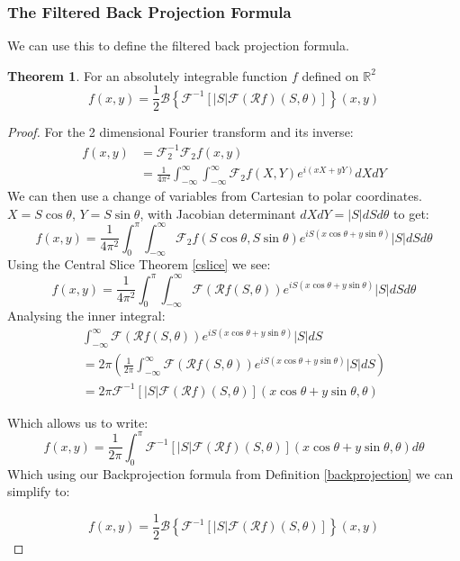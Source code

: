 \documentclass{article}
\theoremstyle{definition}
\newtheorem{theorem}{Theorem}
\begin{document}
\subsubsection{The Filtered Back Projection Formula}
We can use this to define the filtered back projection formula.
\begin{theorem}
For an absolutely integrable function $f$ defined on $\mathbb{R}^2$
$$
f(x,y) = \frac{1}{2} \mathcal{B} \left\lbrace \mathcal{F}^{-1} \left[ |S| \mathcal{F} \left( \mathcal{R}f \right) \left( S, \theta \right) \right] \right\rbrace (x,y)
$$
\end{theorem}
\begin{proof}
For the 2 dimensional Fourier transform and its inverse:
\begin{align}
f(x,y) &= \mathcal{F}_2^{-1} \mathcal{F}_2 f(x,y) \\
&= \frac{1}{4 \pi^2} \int_{-\infty}^{\infty} \int_{-\infty}^{\infty} \mathcal{F}_2 f(X, Y) e^{i (x X + yY)}dXdY
\end{align}
We can then use a change of variables from Cartesian to polar coordinates.
$X = S \cos \theta$, $Y = S \sin \theta$, with Jacobian determinant $dXdY = |S| dS  d\theta$ to get:
$$
f(x,y) = \frac{1}{4 \pi^2} \int_{0}^{\pi} \int_{-\infty}^{\infty} \mathcal{F}_2 f(S \cos \theta, S \sin \theta) e^{i S(x \cos \theta + y \sin \theta)} |S|dSd\theta
$$
Using the Central Slice Theorem \ref{cslice} we see:
$$
f(x,y) = \frac{1}{4 \pi^2} \int_{0}^{\pi} \int_{-\infty}^{\infty} \mathcal{F}(\mathcal{R} f(S , \theta)) e^{i S(x \cos \theta + y \sin \theta)} |S|dSd\theta
$$
Analysing the inner integral:
\begin{align*}
\int_{-\infty}^{\infty} \mathcal{F}(\mathcal{R} f(S , \theta)) e^{i S(x \cos \theta + y \sin \theta)} |S|dS \\
= 2\pi \left( \frac{1}{2 \pi} \int_{-\infty}^{\infty} \mathcal{F}(\mathcal{R} f(S , \theta)) e^{i S(x \cos \theta + y \sin \theta)} |S|dS \right) \\
= 2\pi \mathcal{F}^{-1} \left[ |S| \mathcal{F} \left( \mathcal{R}f \right) \left( S, \theta \right) \right] (x \cos \theta + y \sin \theta, \theta)
\end{align*}

Which allows us to write:
$$
f(x,y) = \frac{1}{2 \pi} \int_{0}^{\pi} \mathcal{F}^{-1} \left[ |S| \mathcal{F} \left( \mathcal{R}f \right) \left( S, \theta \right) \right] (x \cos \theta + y \sin \theta, \theta) d\theta
$$
Which using our Backprojection formula from Definition \ref{backprojection} we can simplify to:

$$
f(x,y) = \frac{1}{2} \mathcal{B} \left\lbrace \mathcal{F}^{-1} \left[ |S| \mathcal{F} \left( \mathcal{R}f \right) \left( S, \theta \right) \right] \right\rbrace (x,y)
$$
\end{proof}
\end{document}
